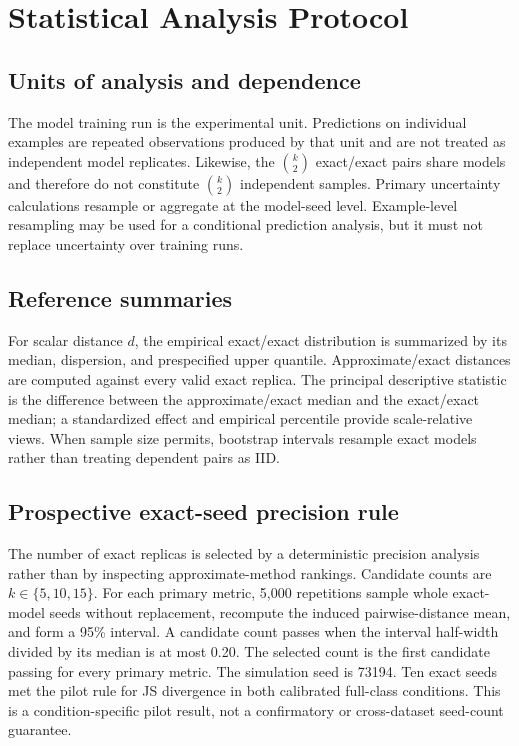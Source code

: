 \section{Statistical Analysis Protocol}
\subsection{Units of analysis and dependence}
The model training run is the experimental unit.  Predictions on individual examples are
repeated observations produced by that unit and are not treated as independent model
replicates.  Likewise, the $\binom{k}{2}$ exact/exact pairs share models and therefore do
not constitute $\binom{k}{2}$ independent samples.  Primary uncertainty calculations
resample or aggregate at the model-seed level.  Example-level resampling may be used for a
conditional prediction analysis, but it must not replace uncertainty over training runs.

\subsection{Reference summaries}
For scalar distance $d$, the empirical exact/exact distribution is summarized by its
median, dispersion, and prespecified upper quantile.  Approximate/exact distances are
computed against every valid exact replica.  The principal descriptive statistic is the
difference between the approximate/exact median and the exact/exact median; a standardized
effect and empirical percentile provide scale-relative views.  When sample size permits,
bootstrap intervals resample exact models rather than treating dependent pairs as IID.

\subsection{Prospective exact-seed precision rule}
The number of exact replicas is selected by a deterministic precision analysis rather than
by inspecting approximate-method rankings.  Candidate counts are $k\in\{5,10,15\}$.  For
each primary metric, 5,000 repetitions sample whole exact-model seeds without replacement,
recompute the induced pairwise-distance mean, and form a 95\% interval.  A candidate count
passes when the interval half-width divided by its median is at most 0.20.  The selected
count is the first candidate passing for every primary metric.  The simulation seed is
73194. Ten exact seeds met the pilot rule for JS divergence in both calibrated full-class
conditions. This is a condition-specific pilot result, not a confirmatory or cross-dataset
seed-count guarantee.

